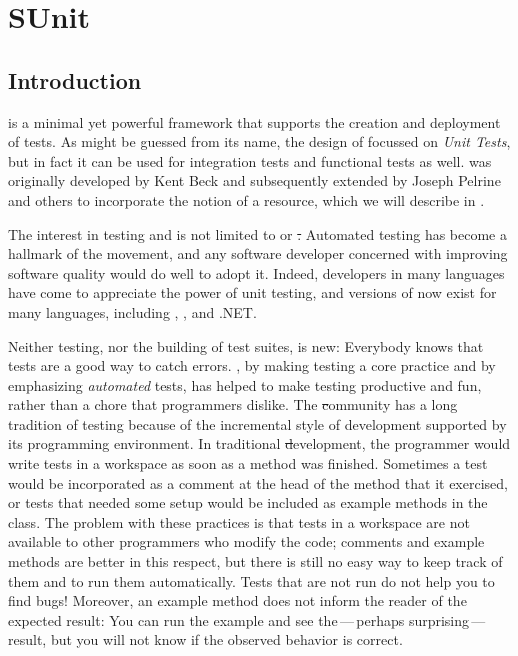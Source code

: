\documentclass[a4paper,10pt,twoside]{book}
\begin{document}
	\renewcommand{\nnbb}[2]{} %
	\sloppy
\fi
\chapter{SUnit}
\label{cha:SUnit}

\section{Introduction}


 is a minimal yet powerful framework that supports the creation and deployment of tests.
As might be guessed from its name, the design of \sunit focussed on \emph{Unit Tests}, 
but in fact it can be used for integration tests and functional tests as well.
\sunit was originally developed by Kent Beck and subsequently extended by Joseph Pelrine and others to incorporate the notion of a resource, which we will describe in .

The interest in testing and  is not limited to \squeak or \st.
Automated testing has become a hallmark of the  movement, and any software developer concerned with improving software quality would do well to adopt it.
Indeed, developers in many languages have come to appreciate the power of unit testing, and versions of \xUnit{} now exist for many languages, including , , and .NET.

Neither testing, nor the building of test suites, is new:
Everybody knows that tests are a good way to catch errors.
\mbox{,} by making testing a core practice and by emphasizing \emph{automated} tests, has helped to make testing productive and fun, rather than a chore that programmers dislike.
The \st community has a long tradition of testing because of the incremental style of development supported by its programming environment.  
In traditional \st development, the programmer would write tests in a workspace as soon as a method was finished.
Sometimes a test would be incorporated as a comment at the head of the method that it exercised, or tests that needed some setup would be included as example methods in the class.
The problem with these practices is that tests in a workspace are not available to other programmers who modify the code; comments and example methods are better in this respect, but there is still no easy way to keep track of them and to run them automatically.
Tests that are not run do not help you to find bugs!
Moreover, an example method does not inform the reader of the expected result:
You can run the example and see the\,---\,perhaps surprising\,---\,result, but you will not know if the observed behavior is correct.
\end{document}
